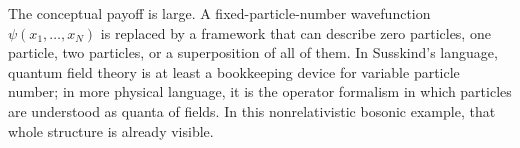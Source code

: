 The conceptual payoff is large. A fixed-particle-number wavefunction \(\psi(x_1,\ldots,x_N)\) is replaced by a framework that can describe zero particles, one particle, two particles, or a superposition of all of them. In Susskind's language, quantum field theory is at least a bookkeeping device for variable particle number; in more physical language, it is the operator formalism in which particles are understood as quanta of fields. In this nonrelativistic bosonic example, that whole structure is already visible.